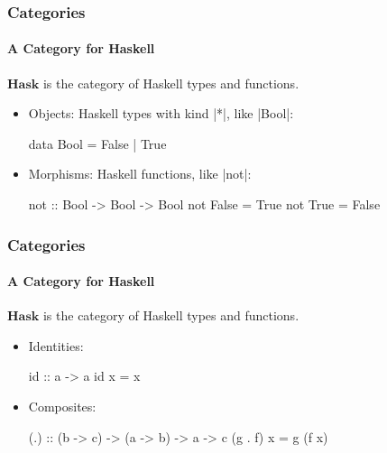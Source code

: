 \documentclass{beamer}
\newcommand{\catbf}[1]{\ensuremath{\mathbf{#1}}\xspace}
\newcommand{\hask}{\catbf{Hask}}
\begin{document}
\begin{frame}[fragile,label={ex:hask}]
  \frametitle{Categories}
  \framesubtitle{A Category for Haskell}

  \begin{example}
    \hask is the category of Haskell types and functions.
    \begin{itemize}
    \item
      Objects: Haskell types with kind |*|, like |Bool|:
      \begin{code}
data Bool = False | True
      \end{code}
    \item
      Morphisms: Haskell functions, like |not|:
      \begin{code}
not :: Bool -> Bool -> Bool
not False = True
not True  = False
      \end{code}
    \end{itemize}
  \end{example}
  \vfill\hfill\hyperlink{re:hask}{\beamergotobutton{}}

\end{frame}


\begin{frame}[fragile]
  \frametitle{Categories}
  \framesubtitle{A Category for Haskell}

  \begin{example}
    \hask is the category of Haskell types and functions.
    \begin{itemize}
    \item
      Identities:
      \begin{code}
id :: a -> a
id x = x
      \end{code}
    \item
      Composites:
      \begin{code}
(.) :: (b -> c) -> (a -> b) -> a -> c
(g . f) x = g (f x)
      \end{code}
    \end{itemize}
  \end{example}

\end{frame}

\end{document}
